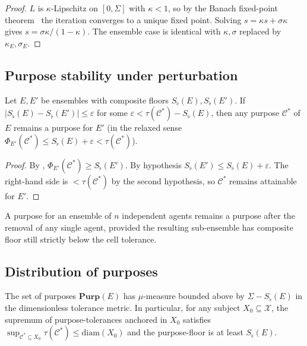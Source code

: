 \documentclass[11pt,twocolumn,a4paper]{article}
\newcommand{\X}{\mathcal{X}}
\newcommand{\Cell}{\mathcal{C}}
\newcommand{\Sfloor}{S_{\flat}}
\newcommand{\eps}{\varepsilon}
\newcommand{\diam}{\mathrm{diam}}
\begin{document}
\begin{proof}
$L$ is $\kappa$-Lipschitz on $[0,\Sigma]$ with $\kappa<1$, so by the
Banach fixed-point theorem~\cite{banach1922} the iteration converges
to a unique fixed point. Solving $s=\kappa s+\sigma\kappa$ gives
$s=\sigma\kappa/(1-\kappa)$. The ensemble case is identical with
$\kappa,\sigma$ replaced by $\kappa_E,\sigma_E$.
\end{proof}

\subsection{Purpose stability under perturbation}

\begin{theorem}\label{thm:purp-stab}
Let $E,E'$ be ensembles with composite floors
$\Sfloor(E),\Sfloor(E')$. If
$|\Sfloor(E)-\Sfloor(E')|\le\eps$ for some $\eps<\tau(\Cell^*)
-\Sfloor(E)$, then any purpose $\Cell^*$ of $E$ remains a purpose for
$E'$ (in the relaxed sense $\Phi_{E'}(\Cell^*)\le\Sfloor(E)+\eps<
\tau(\Cell^*)$).
\end{theorem}

\begin{proof}
By , $\Phi_{E'}(\Cell^*)\ge\Sfloor(E')$. By
hypothesis $\Sfloor(E')\le\Sfloor(E)+\eps$. The right-hand side is
$<\tau(\Cell^*)$ by the second hypothesis, so $\Cell^*$ remains
attainable for $E'$.
\end{proof}

\begin{corollary}\label{cor:dropout}
A purpose for an ensemble of $n$ independent agents remains a purpose
after the removal of any single agent, provided the resulting
sub-ensemble has composite floor still strictly below the cell
tolerance.
\end{corollary}

\subsection{Distribution of purposes}

\begin{theorem}\label{thm:purp-dist}
The set of purposes $\mathbf{Purp}(E)$ has $\mu$-measure bounded above
by $\Sigma-\Sfloor(E)$ in the dimensionless tolerance metric. In
particular, for any subject $X_0\subseteq\X$, the supremum of
purpose-tolerances anchored in $X_0$ satisfies
$\sup_{\Cell^*\subseteq X_0}\tau(\Cell^*)\le\diam(X_0)$ and the
purpose-floor is at least $\Sfloor(E)$.
\end{theorem}
\end{document}
